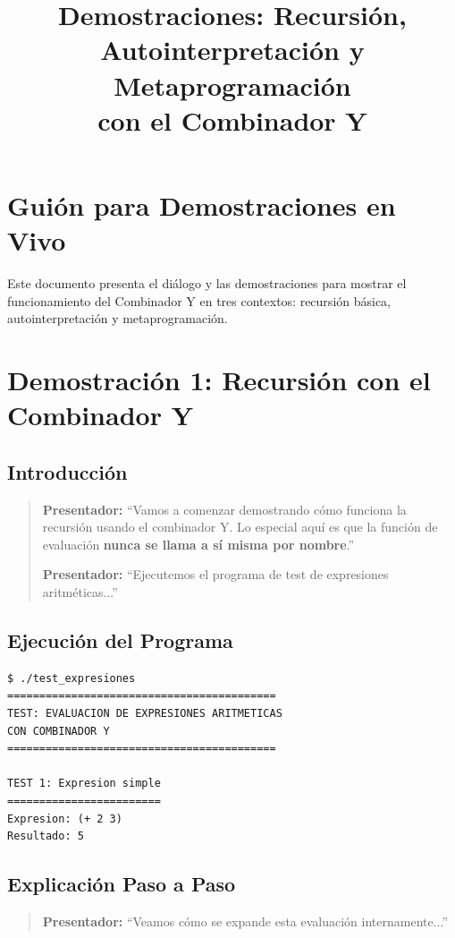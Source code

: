 \documentclass[12pt]{article}
\title{Demostraciones: Recursión, Autointerpretación y Metaprogramación\\
\large con el Combinador Y}
\author{}
\date{}
\begin{document}
\maketitle

\section*{Guión para Demostraciones en Vivo}

Este documento presenta el diálogo y las demostraciones para mostrar el funcionamiento del Combinador Y en tres contextos: recursión básica, autointerpretación y metaprogramación.

\newpage
\section{Demostración 1: Recursión con el Combinador Y}

\subsection*{Introducción}

\begin{quote}
\textbf{Presentador:} ``Vamos a comenzar demostrando cómo funciona la recursión usando el combinador Y. Lo especial aquí es que la función de evaluación \textbf{nunca se llama a sí misma por nombre}.''

\textbf{Presentador:} ``Ejecutemos el programa de test de expresiones aritméticas...''
\end{quote}

\subsection*{Ejecución del Programa}

\begin{verbatim}
$ ./test_expresiones
==========================================
TEST: EVALUACION DE EXPRESIONES ARITMETICAS
CON COMBINADOR Y
==========================================

TEST 1: Expresion simple
========================
Expresion: (+ 2 3)
Resultado: 5
\end{verbatim}

\subsection*{Explicación Paso a Paso}

\begin{quote}
\textbf{Presentador:} ``Veamos cómo se expande esta evaluación internamente...''
\end{quote}
\end{document}
